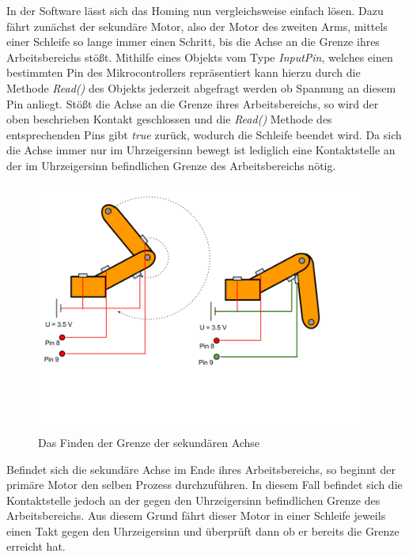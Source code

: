 In der Software lässt sich das Homing nun vergleichsweise einfach lösen. Dazu fährt zunächst der sekundäre Motor, also der Motor des zweiten Arms, mittels einer Schleife so lange immer einen Schritt, bis die Achse an die Grenze ihres Arbeitsbereichs stößt. Mithilfe eines Objekts vom Type \textit{InputPin}, welches einen bestimmten Pin des Mikrocontrollers repräsentiert kann hierzu durch die Methode \textit{Read()} des Objekts jederzeit abgefragt werden ob Spannung an diesem Pin anliegt. Stößt die Achse an die Grenze ihres Arbeitsbereichs, so wird der oben beschrieben Kontakt geschlossen und die \textit{Read()} Methode des entsprechenden Pins gibt \textit{true} zurück, wodurch die Schleife beendet wird. Da sich die Achse immer nur im Uhrzeigersinn bewegt ist lediglich eine Kontaktstelle an der im Uhrzeigersinn befindlichen Grenze des Arbeitsbereichs nötig. 

\begin{figure}[H]
\centering
\includegraphics[width=11cm]{images/Homing}
\caption{Das Finden der Grenze der sekundären Achse}
\end{figure}

Befindet sich die sekundäre Achse im Ende ihres Arbeitsbereichs, so beginnt der primäre Motor den selben Prozess durchzuführen. In diesem Fall befindet sich die Kontaktstelle jedoch an der gegen den Uhrzeigersinn befindlichen Grenze des Arbeitsbereichs. Aus diesem Grund fährt dieser Motor in einer Schleife jeweils einen Takt gegen den Uhrzeigersinn und überprüft dann ob er bereits die Grenze erreicht hat.

